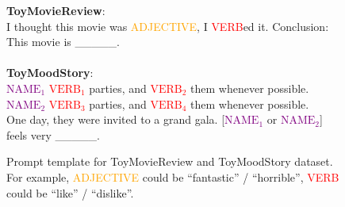 \begin{figure}[h!]
\centering

\begin{tcolorbox}[colback=blue!5!white,colframe=blue!75!black,fontupper=\footnotesize,fonttitle=\scriptsize]
\small
\textbf{ToyMovieReview}: \\
I thought this movie was \textcolor{orange}{ADJECTIVE}, I \textcolor{red}{VERB}ed it. Conclusion: This movie is \_\_\_\_\_.\\
\\
\textbf{ToyMoodStory}: \\
\textcolor{purple}{$\text{NAME}_1$} \textcolor{red}{$\text{VERB}_1$} parties, and \textcolor{red}{$\text{VERB}_2$} them whenever possible.\\
\textcolor{purple}{$\text{NAME}_2$} \textcolor{red}{$\text{VERB}_3$} parties, and \textcolor{red}{$\text{VERB}_4$} them whenever possible.\\
One day, they were invited to a grand gala. [\textcolor{purple}{$\text{NAME}_1$} or \textcolor{purple}{$\text{NAME}_2$}] feels very \_\_\_\_\_.
\end{tcolorbox}
\caption{Prompt template for ToyMovieReview and ToyMoodStory dataset. For example, \textcolor{orange}{ADJECTIVE} could be ``fantastic'' / ``horrible'', \textcolor{red}{VERB} could be ``like'' / ``dislike''.}

\label{fig:SentimentPrompt}
\end{figure}